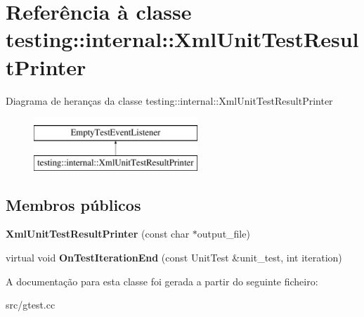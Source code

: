 \hypertarget{classtesting_1_1internal_1_1XmlUnitTestResultPrinter}{\section{Referência à classe testing\-:\-:internal\-:\-:Xml\-Unit\-Test\-Result\-Printer}
\label{classtesting_1_1internal_1_1XmlUnitTestResultPrinter}
}
Diagrama de heranças da classe testing\-:\-:internal\-:\-:Xml\-Unit\-Test\-Result\-Printer\begin{figure}[H]
\begin{center}
\leavevmode
\includegraphics[height=2.000000cm]{classtesting_1_1internal_1_1XmlUnitTestResultPrinter}
\end{center}
\end{figure}
\subsection*{Membros públicos}
\begin{DoxyCompactItemize}
\item 
\hypertarget{classtesting_1_1internal_1_1XmlUnitTestResultPrinter_afdaf88e6764c18ce0dcc3733d7a06e31}{{\bfseries Xml\-Unit\-Test\-Result\-Printer} (const char $\ast$output\-\_\-file)}\label{classtesting_1_1internal_1_1XmlUnitTestResultPrinter_afdaf88e6764c18ce0dcc3733d7a06e31}

\item 
\hypertarget{classtesting_1_1internal_1_1XmlUnitTestResultPrinter_a2ae986dd2f4f2aed31cc6f3bc8c56898}{virtual void {\bfseries On\-Test\-Iteration\-End} (const Unit\-Test \&unit\-\_\-test, int iteration)}\label{classtesting_1_1internal_1_1XmlUnitTestResultPrinter_a2ae986dd2f4f2aed31cc6f3bc8c56898}

\end{DoxyCompactItemize}


A documentação para esta classe foi gerada a partir do seguinte ficheiro\-:\begin{DoxyCompactItemize}
\item 
src/gtest.\-cc\end{DoxyCompactItemize}
